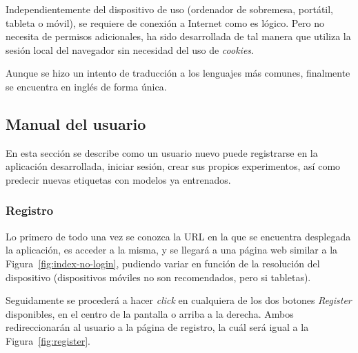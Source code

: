 Independientemente del dispositivo de uso (ordenador de sobremesa, portátil, tableta o móvil), se requiere de conexión a Internet como es lógico. Pero no necesita de permisos adicionales, ha sido desarrollada de tal manera que utiliza la sesión local del navegador sin necesidad del uso de \textit{cookies}.

Aunque se hizo un intento de traducción a los lenguajes más comunes, finalmente se encuentra en inglés de forma única.

\subsection{Manual del usuario}
En esta sección se describe como un usuario nuevo puede registrarse en la aplicación desarrollada, iniciar sesión, crear sus propios experimentos, así como predecir nuevas etiquetas con modelos ya entrenados.

\subsubsection{Registro}

Lo primero de todo una vez se conozca la URL en la que se encuentra desplegada la aplicación, es acceder a la misma, y se llegará a una página web similar a la Figura~\ref{fig:index-no-login}, pudiendo variar en función de la resolución del dispositivo (dispositivos móviles no son recomendados, pero si tabletas). 


Seguidamente se procederá a hacer \textit{click} en cualquiera de los dos botones \textit{Register} disponibles, en el centro de la pantalla o arriba a la derecha. Ambos redireccionarán al usuario a la página de registro, la cuál será igual a la Figura~\ref{fig:register}.

